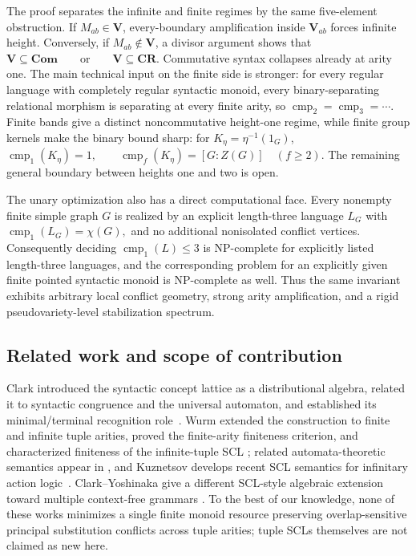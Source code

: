 \documentclass[10pt,a4paper]{article}
\theoremstyle{definition}
\theoremstyle{remark}
\newcommand{\cmp}{\operatorname{cmp}}
\begin{document}
The proof separates the infinite and finite regimes by the same five-element
obstruction.  If \(M_{ab}\in\mathbf V\), every-boundary amplification inside
\(\mathbf V_{ab}\) forces infinite height.  Conversely, if
\(M_{ab}\notin\mathbf V\), a divisor argument shows that
\(\mathbf V\subseteq\mathbf{Com} \qquad\text{or}\qquad \mathbf V\subseteq\mathbf{CR}.\)
Commutative syntax collapses already at arity one.  The main technical input
on the finite side is stronger: for every regular language with completely
regular syntactic monoid, every binary-separating relational morphism is
separating at every finite arity, so
\(\cmp_2=\cmp_3=\cdots\).  Finite bands give a distinct noncommutative
height-one regime, while finite group kernels make the binary bound sharp:
for \(K_\eta=\eta^{-1}(1_G)\),
\(\cmp_1(K_\eta)=1, \qquad \cmp_f(K_\eta)=[G:Z(G)]\quad(f\ge2).\)
The remaining general boundary between heights one and two is open.

The unary optimization also has a direct computational face.  Every nonempty
finite simple graph \(G\) is realized by an explicit length-three language
\(L_G\) with
\(\cmp_1(L_G)=\chi(G),\)
and no additional nonisolated conflict vertices.  Consequently deciding
\(\cmp_1(L)\le3\) is NP-complete for explicitly listed length-three
languages, and the corresponding problem for an explicitly given finite
pointed syntactic monoid is NP-complete as well.  Thus the same invariant
exhibits arbitrary local conflict geometry, strong arity amplification, and a
rigid pseudovariety-level stabilization spectrum.

\subsection{Related work and scope of contribution}

Clark introduced the syntactic concept lattice as a distributional algebra,
related it to syntactic congruence and the universal automaton, and established
its minimal/terminal recognition role~\cite{ClarkSCL}.  Wurm extended the
construction to finite and infinite tuple arities, proved the finite-arity
finiteness criterion, and characterized finiteness of the infinite-tuple SCL
\cite{WurmSCLTuples}; related automata-theoretic semantics appear in
\cite{WurmJLLI2017}, and Kuznetsov develops recent SCL semantics for infinitary
action logic~\cite{Kuznetsov2026}.  Clark--Yoshinaka give a different
SCL-style algebraic extension toward multiple context-free grammars
\cite{ClarkYoshinaka2014}.  To the best of our knowledge, none of these works
minimizes a single finite monoid resource preserving overlap-sensitive principal substitution conflicts
across tuple arities; tuple SCLs themselves are not claimed as new here.
\end{document}
